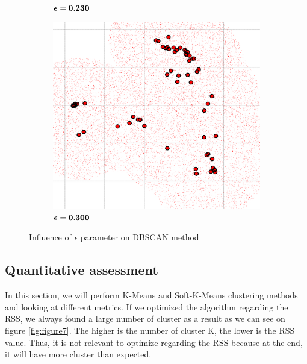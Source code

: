 \begin{figure} [ht]
\begin{subfigure}[h]{0.30\textwidth}
	\caption{$\boldsymbol \epsilon \bf = 0.230$}
    \end{subfigure}
    \begin{subfigure}[h]{0.30\textwidth}
    \centering
    \includegraphics[height=0.18\textheight]{./clustering/dbs_scan_eps_0300_min_3.png}
	\caption{$\boldsymbol \epsilon \bf = 0.300$}
    \end{subfigure}

\caption{Influence of $\epsilon$ parameter on DBSCAN method}
\label{fig:figure6}
\end{figure}

\subsection{Quantitative assessment}

In this section, we will perform K-Means and Soft-K-Means clustering methods and looking at different metrics. If we optimized the algorithm regarding the RSS, we always found a large number of cluster as a result as we can see on figure \ref{fig:figure7}. The higher is the number of cluster K, the lower is the RSS value. Thus, it is not relevant to optimize regarding the RSS because at the end, it will have more cluster than expected. 

